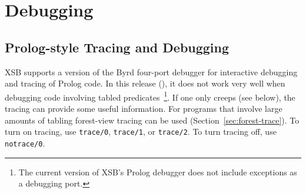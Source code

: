 \chapter{Debugging} \label{debugging}

\section{Prolog-style Tracing and Debugging}
 
%
XSB supports a version of the Byrd four-port debugger for interactive
debugging and tracing of Prolog code.  In this release (\version), it
does not work very well when debugging code involving tabled
predicates~\footnote{The current version of XSB's Prolog debugger does
  not include exceptions as a debugging port.}.  If one only creeps
(see below), the tracing can provide some useful information.  For
programs that involve large amounts of tabling forest-view tracing can
be used (Section~\ref{sec:forest-trace}).
To turn on tracing, use {\tt trace/0}, {\tt trace/1}, or {\tt trace/2}.  To
turn tracing off, use {\tt notrace/0}.


